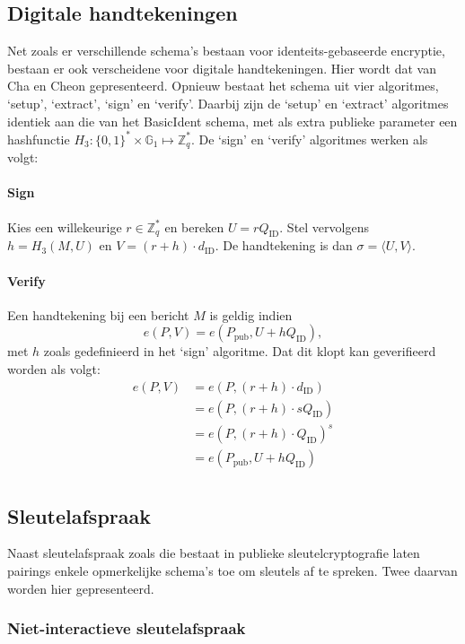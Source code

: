 \subsection{Digitale handtekeningen}

Net zoals er verschillende schema's bestaan voor identeits-gebaseerde  encryptie, bestaan er ook verscheidene voor digitale handtekeningen. Hier wordt dat van Cha en Cheon \cite{cha} gepresenteerd. Opnieuw bestaat het schema uit vier algoritmes, `setup', `extract', `sign' en `verify'. Daarbij zijn de `setup' en `extract' algoritmes identiek aan die van het BasicIdent schema, met als extra publieke parameter een hashfunctie $H_3 : \{ 0,1 \} ^* \times \mathbb{G}_1 \mapsto \mathbb{Z}_q ^*$. De `sign' en `verify' algoritmes werken als volgt:

\paragraph{Sign} Kies een willekeurige $r \in \mathbb{Z}_q^*$ en bereken $U = r Q_{\text{ID}}$. Stel vervolgens $h = H_3(M, U)$ en $V = (r + h) \cdot d_{\text{ID}}$. De handtekening is dan $\sigma = \langle U, V \rangle$.

\paragraph{Verify} Een handtekening bij een bericht $M$ is geldig indien
\[e(P, V) = e(P_{\text{pub}}, U + h Q_{\text{ID}}),\]
met $h$ zoals gedefinieerd in het `sign' algoritme. Dat dit klopt kan geverifieerd worden als volgt:
\[\begin{aligned}
e(P, V)	&= e(P, (r + h) \cdot d_{\text{ID}})\\
			&= e(P, (r + h) \cdot s Q_{\text{ID}})\\
			&= e(P, (r + h) \cdot Q_{\text{ID}})^s\\
			&= e(P_{\text{pub}}, U + h Q_{\text{ID}})\\
\end{aligned}\]

\subsection{Sleutelafspraak}

Naast sleutelafspraak zoals die bestaat in publieke sleutelcryptografie laten pairings enkele opmerkelijke schema's toe om sleutels af te spreken. Twee daarvan worden hier gepresenteerd.

\subsubsection{Niet-interactieve sleutelafspraak}

